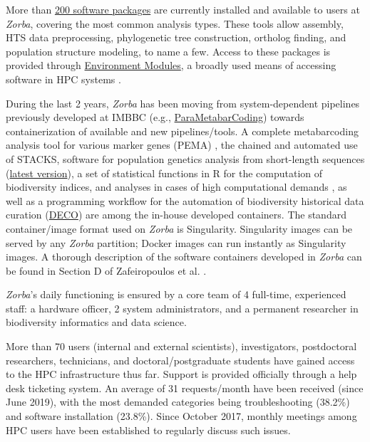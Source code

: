    More than \href{https://hpc.hcmr.gr/software/}{200 software packages} are currently installed and available to users at \textit{Zorba}, covering the most common analysis types. 
   These tools allow assembly, HTS data preprocessing, phylogenetic tree construction, ortholog finding, and population structure modeling, to name a few. 
   Access to these packages is provided through \href{https://modules.readthedocs.io/en/latest/index.html}{Environment Modules}, a broadly used means of accessing software in HPC systems \citep{castrignano2020elixir}.

   During the last 2 years, \textit{Zorba} has been moving from system-dependent pipelines previously developed at IMBBC (e.g., \href{https://github.com/jacqueslagnel/ParaMetabarCoding}{ParaMetabarCoding}) towards containerization of available and new pipelines/tools.
   A complete metabarcoding analysis tool for various marker genes (PEMA) \citep{zafeiropoulos2020pema}, the chained and automated use of STACKS, software for population genetics analysis from short-length sequences \citep{catchen2013stacks} (\href{https://nellieangelova.github.io/RADseq_Containers/}{latest version}), a set of statistical functions in R for the computation of biodiversity indices, and analyses in cases of high computational demands \citep{varsos2016optimized}, as well as a programming workflow for the automation of biodiversity historical data curation (\href{https://github.com/lab42open-team/deco}{DECO}) are among the in-house developed containers. 
   The standard container/image format used on \textit{Zorba} is Singularity. 
   Singularity images can be served by any \textit{Zorba} partition; 
   Docker images can run instantly as Singularity images. 
   A thorough description of the software containers developed in \textit{Zorba} can be found in Section D of Zafeiropoulos et al. \citep{haris_zafeiropoulos_2021_4665308}.

   \textit{Zorba}'s daily functioning is ensured by a core team of 4 full-time, experienced staff: a hardware officer, 2 system administrators, and a permanent researcher in biodiversity informatics and data science.

   More than 70 users (internal and external scientists), investigators, postdoctoral researchers, technicians, and doctoral/postgraduate students have gained access to the HPC infrastructure thus far.
   Support is provided officially through a help desk ticketing system. 
   An average of 31 requests/month have been received (since June 2019), with the most demanded categories being troubleshooting (38.2\%) and software installation (23.8\%). 
   Since October 2017, monthly meetings among HPC users have been established to regularly discuss such issues.

